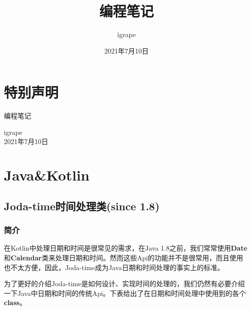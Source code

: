 \documentclass[cn,10pt,math=newtx,citestyle=gb7714-2015,bibstyle=gb7714-2015]{elegantbook}
\title{编程笔记}
\author{igrape}
\institute{TropicalTeamYard}
\date{2021年7月10日}
\begin{document}
    \maketitle

    \frontmatter

    \chapter*{特别声明}


    编程笔记

    \begin{flushright}
    igrape \\
    2021年7月10日
    \end{flushright}
    
    \tableofcontents

    \mainmatter

    \chapter{Java\&Kotlin}

    \section{Joda-time时间处理类(since 1.8)\label{section_1}}

    \begin{flushright}
    \end{flushright}

    \subsection{简介}

    在Kotlin中处理日期和时间是很常见的需求，在Java 1.8之前，我们常常使用\textbf{Date}和\textbf{Calendar}类来处理日期和时间。然而这些Api的功能并不是很常用，而且使用也不太方便，因此，Joda-time成为Java日期和时间处理的事实上的标准。

    为了更好的介绍Joda-time是如何设计、实现时间的处理的，我们仍然有必要介绍一下Java中日期和时间的传统Api。下表给出了在日期和时间处理中使用到的各个\textbf{class}。
\end{document}

